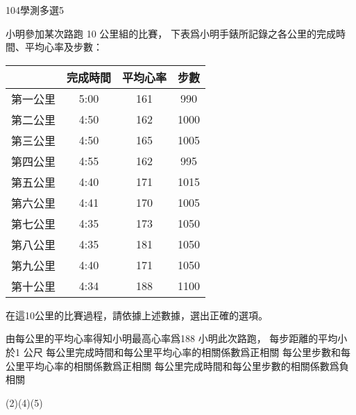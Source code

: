     \begin{QUESTION}
        \begin{ExamInfo}{104}{學測}{多選}{5}
        \end{ExamInfo}
        \begin{ExamAnsRateInfo}{48}{76}{48}{20}
        \end{ExamAnsRateInfo}
        \begin{QBODY}
            小明參加某次路跑 10 公里組的比賽， 下表爲小明手錶所記錄之各公里的完成時間、平均心率及步數：
                \begin{tabular}{|c|c|c|c|}
                    \hline 
					    {}   & 完成時間  &	平均心率	& 步數  \\ \hline
					第一公里 &	5:00	 &  161	        & 990   \\ \hline
					第二公里 &	4:50	 &  162	        & 1000  \\ \hline
					第三公里 &	4:50	 &  165	        & 1005  \\ \hline
					第四公里 &	4:55	 &  162	        & 995   \\ \hline
					第五公里 &	4:40	 &  171	        & 1015  \\ \hline
					第六公里 &	4:41	 &  170	        & 1005  \\ \hline
					第七公里 &	4:35	 &  173	        & 1050  \\ \hline
					第八公里 &	4:35	 &  181	        & 1050  \\ \hline
					第九公里 &	4:40	 &  171	        & 1050  \\ \hline
					第十公里 &	4:34	 &  188	        & 1100  \\ \hline
                \end{tabular} 
			在這10公里的比賽過程，請依據上述數據，選出正確的選項。
			\begin{QOPS}
				\QOP 由每公里的平均心率得知小明最高心率爲188
				\QOP 小明此次路跑， 每步距離的平均小於1 公尺
				\QOP 每公里完成時間和每公里平均心率的相關係數爲正相關
				\QOP 每公里步數和每公里平均心率的相關係數爲正相關
				\QOP 每公里完成時間和每公里步數的相關係數爲負相關
			\end{QOPS}
        \end{QBODY}
        \begin{QFROMS}
        \end{QFROMS}
        \begin{QTAGS}\end{QTAGS}
        \begin{QANS}
            (2)(4)(5)
        \end{QANS}
        \begin{QSOLLIST}
        \end{QSOLLIST}
        \begin{QEMPTYSPACE}
        \end{QEMPTYSPACE}
    \end{QUESTION}
